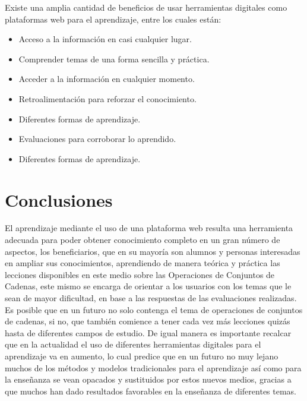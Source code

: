 \documentclass{llncs}
\begin{document}
Existe una amplia cantidad de beneficios de usar herramientas digitales como plataformas web para el aprendizaje, entre los cuales están:
\begin{itemize}
\item Acceso a la información en casi cualquier lugar.
\end{itemize}
\begin{itemize}
\item Comprender temas de una forma sencilla y práctica.
\end{itemize}
\begin{itemize}
\item Acceder a la información en cualquier momento.
\end{itemize}
\begin{itemize}
\item  Retroalimentación para reforzar el conocimiento.
\end{itemize}
\begin{itemize}
\item  Diferentes formas de aprendizaje.
\end{itemize}
\begin{itemize}
\item Evaluaciones para corroborar lo aprendido.
\end{itemize}
\begin{itemize}
\item Diferentes formas de aprendizaje.
\end{itemize}

%

%
\section{Conclusiones}
El aprendizaje mediante el uso de una plataforma web resulta una herramienta adecuada para poder obtener conocimiento completo en un gran número de aspectos, los beneficiarios, que en su mayoría son alumnos y personas interesadas en ampliar sus conocimientos, aprendiendo de manera teórica y práctica las lecciones disponibles en este medio sobre las Operaciones de Conjuntos de Cadenas, este mismo se encarga de orientar a los usuarios con los temas que le sean de mayor dificultad, en base a las respuestas de las evaluaciones realizadas. Es posible que en un futuro no solo contenga el tema de operaciones de conjuntos de cadenas, si no, que también comience a tener cada vez más lecciones quizás hasta de diferentes campos de estudio. De igual manera es importante recalcar que en la actualidad el uso de diferentes herramientas digitales para el aprendizaje va en aumento, lo cual predice que en un futuro no muy lejano muchos de los métodos y modelos tradicionales para el aprendizaje así como para la enseñanza se vean opacados y sustituidos por estos nuevos medios, gracias a que muchos han dado resultados favorables en la enseñanza de diferentes temas.
\end{document}
